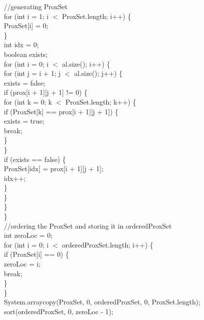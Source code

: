 \begin{ttfamily   }
\begin{scriptsize}
        \noindent//generating ProxSet\\
        \noindent for (int i = 1;   i $<$ ProxSet.length;   i++) \{\\
            ProxSet[i] = 0;\\
        \}\\
        int idx = 0;\\
        boolean exists;\\
        \noindent for (int i = 0;   i $<$ al.size();   i++) \{\\
            \noindent for (int j = i + 1;   j $<$ al.size();   j++) \{\\
                exists = false;\\
                if (prox[i + 1][j + 1] != 0) \{\\
                    \noindent for (int k = 0;   k $<$ ProxSet.length;   k++) \{\\
                        if (ProxSet[k] == prox[i + 1][j + 1]) \{\\
                            exists = true;\\
                            break;\\
                        \}\\
                    \}\\
                    if (exists == false) \{\\
                        ProxSet[idx] = prox[i + 1][j + 1];\\
                        idx++;\\
                    \}\\
                \}\\
            \}\\
        \}\\

        \noindent//ordering the ProxSet and storing it in orderedProxSet\\
        int zeroLoc = 0;\\
        \noindent for (int i = 0;   i $<$ orderedProxSet.length;   i++) \{\\
            if (ProxSet[i] == 0) \{\\
                zeroLoc = i;\\
                break;\\
            \}\\
        \}\\
        System.arraycopy(ProxSet, 0, orderedProxSet, 0, ProxSet.length);\\
        sort(orderedProxSet, 0, zeroLoc - 1);\\


\end{scriptsize}
\end{ttfamily   }
